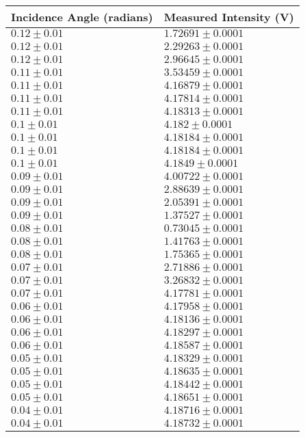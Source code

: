 \begin{tabular}{| p{} | p{} |}
\hline
Incidence Angle (radians) & Measured Intensity (V)\\
\hline
$0.12 \pm 0.01$ & $1.72691 \pm 0.0001$\\
$0.12 \pm 0.01$ & $2.29263 \pm 0.0001$\\
$0.12 \pm 0.01$ & $2.96645 \pm 0.0001$\\
$0.11 \pm 0.01$ & $3.53459 \pm 0.0001$\\
$0.11 \pm 0.01$ & $4.16879 \pm 0.0001$\\
$0.11 \pm 0.01$ & $4.17814 \pm 0.0001$\\
$0.11 \pm 0.01$ & $4.18313 \pm 0.0001$\\
$0.1 \pm 0.01$ & $4.182 \pm 0.0001$\\
$0.1 \pm 0.01$ & $4.18184 \pm 0.0001$\\
$0.1 \pm 0.01$ & $4.18184 \pm 0.0001$\\
$0.1 \pm 0.01$ & $4.1849 \pm 0.0001$\\
$0.09 \pm 0.01$ & $4.00722 \pm 0.0001$\\
$0.09 \pm 0.01$ & $2.88639 \pm 0.0001$\\
$0.09 \pm 0.01$ & $2.05391 \pm 0.0001$\\
$0.09 \pm 0.01$ & $1.37527 \pm 0.0001$\\
$0.08 \pm 0.01$ & $0.73045 \pm 0.0001$\\
$0.08 \pm 0.01$ & $1.41763 \pm 0.0001$\\
$0.08 \pm 0.01$ & $1.75365 \pm 0.0001$\\
$0.07 \pm 0.01$ & $2.71886 \pm 0.0001$\\
$0.07 \pm 0.01$ & $3.26832 \pm 0.0001$\\
$0.07 \pm 0.01$ & $4.17781 \pm 0.0001$\\
$0.06 \pm 0.01$ & $4.17958 \pm 0.0001$\\
$0.06 \pm 0.01$ & $4.18136 \pm 0.0001$\\
$0.06 \pm 0.01$ & $4.18297 \pm 0.0001$\\
$0.06 \pm 0.01$ & $4.18587 \pm 0.0001$\\
$0.05 \pm 0.01$ & $4.18329 \pm 0.0001$\\
$0.05 \pm 0.01$ & $4.18635 \pm 0.0001$\\
$0.05 \pm 0.01$ & $4.18442 \pm 0.0001$\\
$0.05 \pm 0.01$ & $4.18651 \pm 0.0001$\\
$0.04 \pm 0.01$ & $4.18716 \pm 0.0001$\\
$0.04 \pm 0.01$ & $4.18732 \pm 0.0001$\\
\hline
\end{tabular}\\
